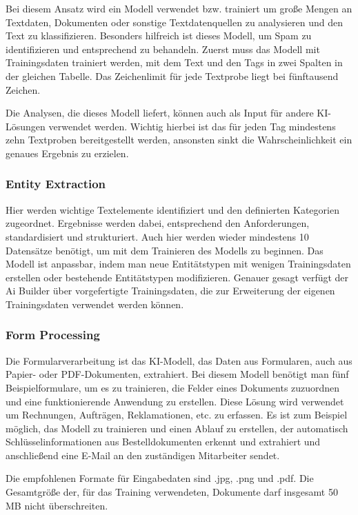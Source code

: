 Bei diesem Ansatz wird ein Modell verwendet bzw. trainiert um große Mengen an Textdaten, Dokumenten oder sonstige Textdatenquellen zu analysieren und den Text zu klassifizieren. Besonders hilfreich ist dieses Modell, um Spam zu identifizieren und entsprechend zu behandeln. Zuerst muss das Modell mit Trainingsdaten trainiert werden, mit dem Text und den Tags in zwei Spalten in der gleichen Tabelle. Das Zeichenlimit für jede Textprobe liegt bei fünftausend Zeichen.

Die Analysen, die dieses Modell liefert, können auch als Input für andere KI-Lösungen verwendet werden. Wichtig hierbei ist das für jeden Tag mindestens zehn Textproben bereitgestellt werden, ansonsten sinkt die Wahrscheinlichkeit ein genaues Ergebnis zu erzielen.

\subsubsection{Entity Extraction}

Hier werden wichtige Textelemente identifiziert und den definierten Kategorien zugeordnet. Ergebnisse werden dabei, entsprechend den Anforderungen, standardisiert und strukturiert. Auch hier werden wieder mindestens 10 Datensätze benötigt, um mit dem Trainieren des Modells zu beginnen. Das Modell ist anpassbar, indem man neue Entitätstypen mit wenigen Trainingsdaten erstellen oder bestehende Entitätstypen modifizieren. Genauer gesagt verfügt der Ai Builder über vorgefertigte Trainingsdaten, die zur Erweiterung der eigenen Trainingsdaten verwendet werden können.

\subsubsection{Form Processing}

Die Formularverarbeitung ist das KI-Modell, das Daten aus Formularen, auch aus Papier- oder PDF-Dokumenten, extrahiert. Bei diesem Modell benötigt man fünf Beispielformulare, um es zu trainieren, die Felder eines Dokuments zuzuordnen und eine funktionierende Anwendung zu erstellen. Diese Lösung wird verwendet um Rechnungen, Aufträgen, Reklamationen, etc. zu erfassen. Es ist zum Beispiel möglich, das Modell zu trainieren und einen Ablauf zu erstellen, der automatisch Schlüsselinformationen aus Bestelldokumenten erkennt und extrahiert und anschließend eine E-Mail an den zuständigen Mitarbeiter sendet.

Die empfohlenen Formate für Eingabedaten sind .jpg, .png und .pdf. Die Gesamtgröße der, für das Training verwendeten, Dokumente darf insgesamt 50 MB nicht überschreiten.

